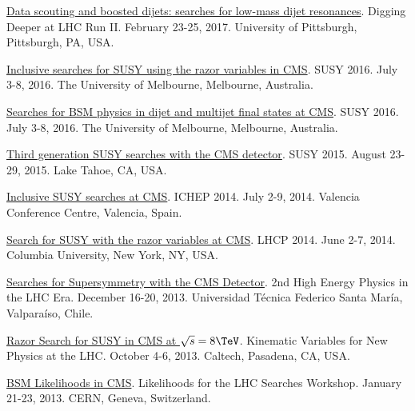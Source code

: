 \documentclass[11pt]{res}
\begin{document}
\begin{resume}
\begin{itemize}
{    \item \href{https://indico.cern.ch/event/592671/contributions/2401900/}{Data scouting and boosted dijets: searches for low-mass dijet resonances}. Digging Deeper at LHC Run II. February 23-25, 2017. University of Pittsburgh, Pittsburgh, PA, USA.
    \item \href{https://indico.cern.ch/event/443176/contributions/2148316/}{Inclusive searches for SUSY using the razor variables in CMS}. SUSY 2016. July 3-8, 2016. The University of Melbourne, Melbourne, Australia.
    \item \href{https://indico.cern.ch/event/443176/contributions/2154549/}{Searches for BSM physics in dijet and multijet final states at CMS}. SUSY 2016. July 3-8, 2016. The University of Melbourne, Melbourne, Australia.
    \item \href{https://indico.cern.ch/event/331032/contributions/1720249/}{Third generation SUSY searches with the CMS detector}. SUSY 2015. August 23-29, 2015. Lake Tahoe, CA, USA.
    \item \href{https://indico.ific.uv.es/indico/contributionDisplay.py?sessionId=24&contribId=289&confId=2025}{Inclusive SUSY searches at CMS}. ICHEP 2014. July 2-9, 2014. Valencia Conference Centre, Valencia, Spain.
    \item \href{https://indico.cern.ch/event/279518/contributions/634785/}{Search for SUSY with the razor variables at CMS}. LHCP 2014. June 2-7, 2014. Columbia University, New York, NY, USA.
    \item \href{https://indico.cern.ch/event/252857/contributions/1579321/}{Searches for Supersymmetry with the CMS Detector}. 2nd High Energy Physics in the LHC Era. December 16-20, 2013. Universidad T\'{e}cnica Federico Santa Mar\'{i}a, Valpara\'{i}so, Chile.
    \item \href{https://indico.cern.ch/event/261650/contributions/586374/}{Razor Search for SUSY in CMS at $\sqrt{s}=8\TeV$}. Kinematic Variables for New Physics at the LHC. October 4-6, 2013. Caltech, Pasadena, CA, USA.
    \item \href{https://indico.cern.ch/event/218693/contributions/1520333/}{BSM Likelihoods in CMS}. Likelihoods for the LHC Searches Workshop. January 21-23, 2013. CERN, Geneva, Switzerland.
          }{}
  \end{itemize}



\end{resume}
\end{document}
